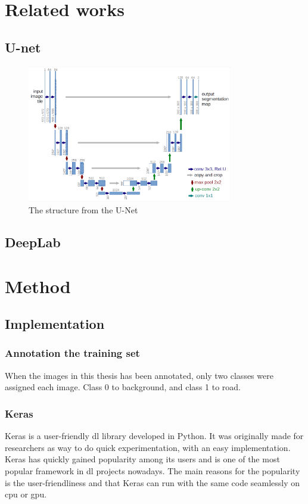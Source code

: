 \documentclass[USenglish]{ifimaster}  %
\begin{document}
\chapter{Related works}
\section{U-net}

\begin{figure}[ht]
    \centering
    \includegraphics[width=0.8\textwidth]{bilder/u_net.png}
    \caption{The structure from the U-Net \cite{website:u_net}}
    \label{fig:u_net}
\end{figure}

\section{DeepLab}

\chapter{Method}
\section{Implementation}
\subsection{Annotation the training set}
When the images in this thesis has been annotated, only two classes were assigned each image. Class 0 to background, and class 1 to road.
\subsection{Keras}
Keras is a user-friendly \ac{dl} library developed in Python. It was originally made for researchers as way to do quick experimentation, with an easy implementation. Keras has quickly gained popularity among its users and is one of the most popular framework in \ac{dl} projects nowadays. The main reasons for the popularity is the user-friendliness and that Keras can run with the same code seamlessly on \ac{cpu} or \ac{gpu}\cite{Francois_Deep_learning_with_python}.
\end{document}
